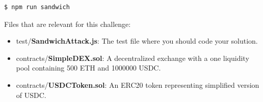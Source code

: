 \documentclass[12pt]{article}
\begin{document}
\begin{verbatim}
$ npm run sandwich
\end{verbatim}

\noindent
Files that are relevant for this challenge:
\begin{itemize}
\item test/\textbf{SandwichAttack.js}: The test file where you should code your solution.
\item contracts/\textbf{SimpleDEX.sol}: A decentralized exchange with a one liquidity pool containing 500 ETH and 1000000 USDC.
\item contracts/\textbf{USDCToken.sol}: An ERC20 token representing simplified version of USDC.
\end{itemize}
\end{document}
